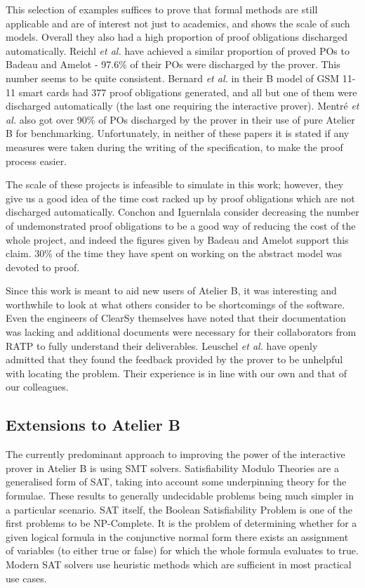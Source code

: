 \documentclass[12pt,journal,duplex]{IEEEtran}
\begin{document}
	This selection of examples suffices to prove that formal methods are still applicable and are of interest not just to academics, and shows the scale of such models. Overall they also had a high proportion of proof obligations discharged automatically. Reichl \emph{et al.} have achieved a similar proportion of proved POs to Badeau and Amelot - 97.6\% of their POs were discharged  by the prover. This number seems to be quite consistent. Bernard \emph{et al.} in their B model of GSM 11-11 smart cards had 377 proof obligations generated, and all but one of them were discharged automatically (the last one requiring the interactive prover)\cite{GSM}. Mentr\'{e} \emph{et al.} also got over 90\% of POs discharged by the prover in their use of pure Atelier B for benchmarking.\cite{discharging} 	Unfortunately, in neither of these papers it is stated if any measures were taken during the writing of the specification, to make the proof process easier.

	The scale of these projects is infeasible to simulate in this work; however, they give us a good idea of the time cost racked up by proof obligations which are not discharged automatically. Conchon and Iguernlala consider decreasing the number of undemonstrated proof obligations to be a good way of reducing the cost of the whole project\cite{survey}, and indeed the figures given by Badeau and Amelot support this claim. 30\% of the time they have spent on working on the abstract model was devoted to proof\cite{airport shuttle}.

	Since this work is meant to aid new users of Atelier B, it was interesting and worthwhile to look at what others consider to be shortcomings of the software. Even the engineers of ClearSy themselves have noted that their documentation was lacking and additional documents were necessary for their collaborators from RATP to fully understand their deliverables\cite{screen doors}. Leuschel \emph{et al.} have openly admitted that they found the feedback provided by the prover to be unhelpful with locating the problem\cite{San Juan metro}. Their experience is in line with our own and that of our colleagues.

	\subsection{Extensions to Atelier B}
	
	The currently predominant approach to improving the power of the interactive prover in Atelier B is using SMT solvers. Satisfiability Modulo Theories are a generalised form of SAT, taking into account some underpinning theory for the formulae.  These results to generally undecidable problems being much simpler in a particular scenario.\cite{SMT handbook} SAT itself, the Boolean Satisfiability Problem is one of the first problems to be NP-Complete. It is the problem of determining whether for a given logical formula in the  conjunctive normal form there exists an assignment of variables (to either true or false) for which the whole formula evaluates to true. Modern SAT solvers use heuristic methods which are sufficient in most practical use cases\cite{SAT}.
	
\end{document}
